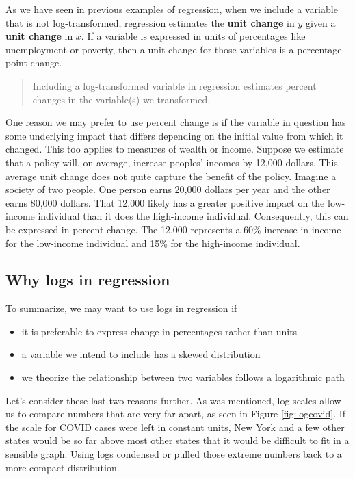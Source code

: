 \documentclass[
]{book}
\providecommand{\tightlist}{%
  \setlength{\itemsep}{0pt}\setlength{\parskip}{0pt}}
\begin{document}
As we have seen in previous examples of regression, when we include a variable that is not log-transformed, regression estimates the \textbf{unit change} in \(y\) given a \textbf{unit change} in \(x\). If a variable is expressed in units of percentages like unemployment or poverty, then a unit change for those variables is a percentage point change.

\begin{quote}
Including a log-transformed variable in regression estimates percent changes in the variable(s) we transformed.
\end{quote}

One reason we may prefer to use percent change is if the variable in question has some underlying impact that differs depending on the initial value from which it changed. This too applies to measures of wealth or income. Suppose we estimate that a policy will, on average, increase peoples' incomes by 12,000 dollars. This average unit change does not quite capture the benefit of the policy. Imagine a society of two people. One person earns 20,000 dollars per year and the other earns 80,000 dollars. That 12,000 likely has a greater positive impact on the low-income individual than it does the high-income individual. Consequently, this can be expressed in percent change. The 12,000 represents a 60\% increase in income for the low-income individual and 15\% for the high-income individual.

\hypertarget{why-logs-in-regression}{%
\subsection{Why logs in regression}\label{why-logs-in-regression}}

To summarize, we may want to use logs in regression if

\begin{itemize}
\tightlist
\item
  it is preferable to express change in percentages rather than units
\item
  a variable we intend to include has a skewed distribution
\item
  we theorize the relationship between two variables follows a logarithmic path
\end{itemize}

Let's consider these last two reasons further. As was mentioned, log scales allow us to compare numbers that are very far apart, as seen in Figure \ref{fig:logcovid}. If the scale for COVID cases were left in constant units, New York and a few other states would be so far above most other states that it would be difficult to fit in a sensible graph. Using logs condensed or pulled those extreme numbers back to a more compact distribution.
\end{document}
